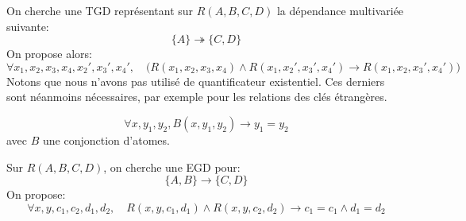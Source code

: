 \documentclass[french, toc]{../cs-classes/cs-classes}
\begin{document}
\begin{exemple}
    On cherche une TGD représentant sur $R(A, B, C, D)$ la dépendance multivariée suivante:
    \begin{equation*}
        \{A\} \twoheadrightarrow \{C, D\}
    \end{equation*}
    On propose alors:
    \begin{equation*}
        \forall x_1, x_2, x_3, x_4, x_2', x_3', x_4', \quad \big(R(x_1, x_2, x_3, x_4) \land R(x_1, x_2', x_3', x_4') \rightarrow R(x_1, x_2, x_3', x_4')\big)
    \end{equation*}
    Notons que nous n'avons pas utilisé de quantificateur existentiel. Ces derniers sont néanmoins nécessaires, par exemple pour les relations des clés étrangères.
\end{exemple}

\begin{definition}
    \begin{equation*}
        \forall x, y_1, y_2, B(x, y_1, y_2) \rightarrow y_1 = y_2
    \end{equation*}
    avec $B$ une conjonction d'atomes.
\end{definition}

\begin{exemple}
    Sur $R(A, B, C, D)$, on cherche une EGD pour:
    \begin{equation*}
        \{A, B\} \rightarrow \{C, D\}
    \end{equation*}
    On propose:
    \begin{equation*}
        \forall x, y, c_1, c_2, d_1, d_2, \quad R(x, y, c_1, d_1) \land R(x, y, c_2, d_2) \rightarrow c_1=c_1 \land d_1=d_2
    \end{equation*}
\end{exemple}
\end{document}
